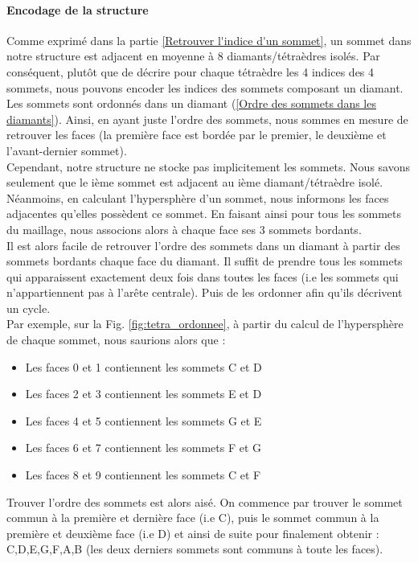 \paragraph{Encodage de la structure}
Comme exprimé dans la partie \ref{Retrouver l'indice d'un sommet}, un sommet dans notre structure est adjacent en moyenne à 8 diamants/tétraèdres isolés. Par conséquent, plutôt que de décrire pour chaque tétraèdre les 4 indices des 4 sommets, nous pouvons encoder les indices des sommets composant un diamant. Les sommets sont ordonnés dans un diamant (\ref{Ordre des sommets dans les diamants}). Ainsi, en ayant juste l'ordre des sommets, nous sommes en mesure de retrouver les faces (la première face est bordée par le premier, le deuxième et l'avant-dernier sommet).\\
Cependant, notre structure ne stocke pas implicitement les sommets. Nous savons seulement que le ième sommet est adjacent au ième diamant/tétraèdre isolé. Néanmoins, en calculant l'hypersphère d'un sommet, nous informons les faces adjacentes qu'elles possèdent ce sommet. En faisant ainsi pour tous les sommets du maillage, nous associons alors à chaque face ses 3 sommets bordants.\\
Il est alors facile de retrouver l'ordre des sommets dans un diamant à partir des sommets bordants chaque face du diamant. Il suffit de prendre tous les sommets qui apparaissent exactement deux fois dans toutes les faces (i.e les sommets qui n'appartiennent pas à l'arête centrale). Puis de les ordonner afin qu'ils décrivent un cycle.\\
Par exemple, sur la Fig. \ref{fig:tetra_ordonnee}, à partir du calcul de l'hypersphère de chaque sommet, nous saurions alors que :
\begin{itemize}
\item Les faces 0 et 1 contiennent les sommets C et D
\item Les faces 2 et 3 contiennent les sommets E et D
\item Les faces 4 et 5 contiennent les sommets G et E
\item Les faces 6 et 7 contiennent les sommets F et G
\item Les faces 8 et 9 contiennent les sommets C et F\\
\end{itemize}
Trouver l'ordre des sommets est alors aisé. On commence par trouver le sommet commun à la première et dernière face (i.e C), puis le sommet commun à la première et deuxième face (i.e D) et ainsi de suite pour finalement obtenir : C,D,E,G,F,A,B (les deux derniers sommets sont communs à toute les faces).

